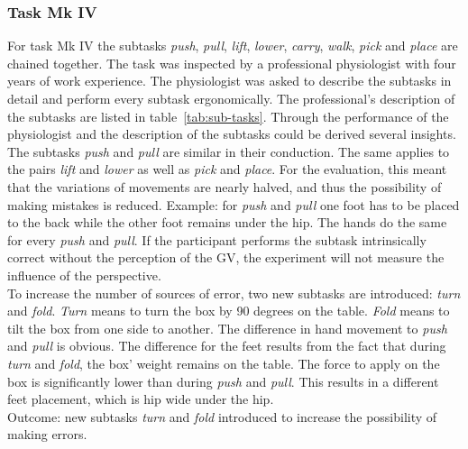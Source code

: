 \subsubsection{Task Mk IV}
For task Mk IV the subtasks \textit{push}, \textit{pull}, \textit{lift}, \textit{lower}, \textit{carry}, \textit{walk}, \textit{pick} and \textit{place} are chained together. The task was inspected by a professional physiologist with four years of work experience. The physiologist was asked to describe the subtasks in detail and perform every subtask ergonomically. The professional's description of the subtasks are listed in table~\ref{tab:sub-tasks}. Through the performance of the physiologist and the description of the subtasks could be derived several insights. The subtasks \textit{push} and \textit{pull} are similar in their conduction. The same applies to the pairs \textit{lift} and \textit{lower} as well as \textit{pick} and \textit{place}. For the evaluation, this meant that the variations of movements are nearly halved, and thus the possibility of making mistakes is reduced. Example: for \textit{push} and \textit{pull} one foot has to be placed to the back while the other foot remains under the hip. The hands do the same for every \textit{push} and \textit{pull}. If the participant performs the subtask intrinsically correct without the perception of the GV, the experiment will not measure the influence of the perspective.\\
To increase the number of sources of error, two new subtasks are introduced: \textit{turn} and \textit{fold}. \textit{Turn} means to turn the box by 90 degrees on the table. \textit{Fold} means to tilt the box from one side to another. The difference in hand movement to \textit{push} and \textit{pull} is obvious. The difference for the feet results from the fact that during \textit{turn} and \textit{fold}, the box' weight remains on the table. The force to apply on the box is significantly lower than during \textit{push} and \textit{pull}. This results in a different feet placement, which is hip wide under the hip.\\
Outcome: new subtasks \textit{turn} and \textit{fold} introduced to increase the possibility of making errors.

